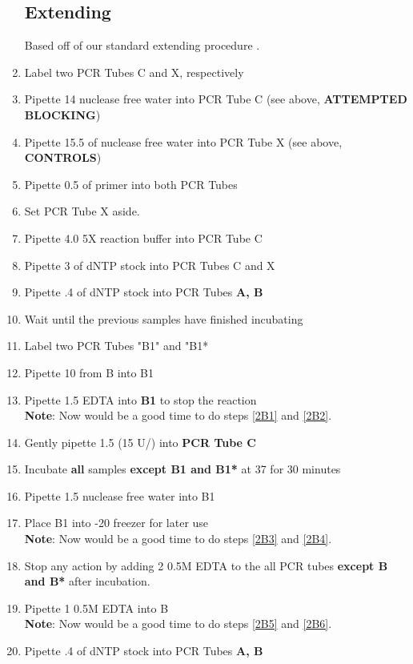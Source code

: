 \documentclass{ssiBio}
\begin{document}
\begin{enumerate}
\subsection{Extending}
Based off of our standard \tdt{} extending procedure \cite{genTdT}.
\item{Label two PCR Tubes C and X, respectively}
\item{Pipette 14\uL{} nuclease free water into PCR Tube C (see above, \textbf{ATTEMPTED BLOCKING})}
\item{Pipette 15.5\uL{} of nuclease free water into PCR Tube X (see above, \textbf{CONTROLS})}
\item{Pipette 0.5\uL{} of primer into both PCR Tubes}
\item{Set PCR Tube X aside.}
\item{Pipette 4.0\uL{} 5X \tdt{} reaction buffer into PCR Tube C}
\item{Pipette 3\uL{} of dNTP stock into PCR Tubes C and X}
\item{Pipette .4\uL{} of dNTP stock into PCR Tubes \textbf{A, B}}
\item{Wait until the previous samples have finished incubating}
\item{Label two PCR Tubes "B1" and "B1*}
\item{Pipette 10\uL{} from B into B1}
\item{Pipette 1.5\uL{} EDTA into \textbf{B1} to stop the reaction \cite{Invitrogen2002}}\\
	\textbf{Note}: Now would be a good time to do steps \ref{2B1} and \ref{2B2}.
\item{Gently pipette 1.5\uL{} \tdt{} (15 U/\uL{}) into \textbf{PCR Tube C}}
\item{Incubate \textbf{all} samples \textbf{except B1 and B1*} at 37\C{} for 30 minutes}
\item{Pipette 1.5\uL{} nuclease free water into B1}
\item{Place B1 into -20\C{} freezer for later use}\\
	\textbf{Note}: Now would be a good time to do steps \ref{2B3} and \ref{2B4}.
\item{Stop any \tdt action by adding 2\uL{} 0.5M EDTA to the all PCR tubes \textbf{except B and B*} after incubation.\cite{Invitrogen2002}}
\item{Pipette 1\uL{} 0.5M EDTA into B}\\
\textbf{Note}: Now would be a good time to do steps \ref{2B5} and \ref{2B6}.
\item{Pipette .4\uL{} of dNTP stock into PCR Tubes \textbf{A, B}}


\end{enumerate}
\end{document}
